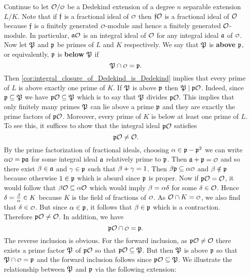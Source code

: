     Continue to let $\mc{O}/\smc{O}$ be a Dedekind extension of a degree $n$ separable extension $L/K$. Note that if $\mathfrak{f}$ is a fractional ideal of $\smc{O}$ then $\mathfrak{f}\mathcal{O}$ is a fractional ideal of $\mathcal{O}$ because $\mathfrak{f}$ is a finitely generated $\smc{O}$-module and hence a finitely generated $\mathcal{O}$-module. In particular, $\mathfrak{a}\mathcal{O}$ is an integral ideal of $\mathcal{O}$ for any integral ideal $\mathfrak{a}$ of $\smc{O}$. Now let $\mathfrak{P}$ and $\mathfrak{p}$ be primes of $L$ and $K$ respectively. We say that $\mathfrak{P}$ is \textbf{above} $\mathfrak{p}$, or equivalently, $\mathfrak{p}$ is \textbf{below} $\mathfrak{P}$ if
    \[
      \mf{P} \cap \smc{O} = \mf{p}.
    \]
    Then \cref{cor:integral_closure_of_Dedekind_is_Dedekind} implies that every prime of $L$ is above exactly one prime of $K$. If $\mathfrak{P}$ is above $\mathfrak{p}$ then $\mathfrak{P} \mid \mathfrak{p}\mathcal{O}$. Indeed, since $\mathfrak{p} \subseteq \mathfrak{P}$ we have $\mathfrak{p}\mathcal{O} \subseteq \mathfrak{P}$ which is to say that $\mathfrak{P}$ divides $\mathfrak{p}\mathcal{O}$. This implies that only finitely many primes $\mathfrak{P}$ can lie above a prime $\mathfrak{p}$ and they are exactly the prime factors of $\mathfrak{p}\mathcal{O}$. Moreover, every prime of $K$ is below at least one prime of $L$. To see this, it suffices to show that the integral ideal $\mathfrak{p}\mathcal{O}$ satisfies
    \[
      \mathfrak{p}\mathcal{O} \neq \mathcal{O}.
    \]
    By the prime factorization of fractional ideals, choosing $\alpha \in \mathfrak{p}-\mathfrak{p}^{2}$ we can write $\a\smc{O} = \mf{p}\mf{a}$ for some integral ideal $\mathfrak{a}$ relatively prime to $\mathfrak{p}$. Then $\mf{a}+\mf{p} = \smc{O}$ and so there exist $\beta \in \mathfrak{a}$ and $\gamma \in \mathfrak{p}$ such that $\beta+\gamma = 1$. Then $\b\mf{p} \subseteq \a\smc{O}$ and $\beta \notin \mathfrak{p}$ because otherwise $1 \in \mathfrak{p}$ which is absurd since $\mathfrak{p}$ is proper. Now if $\mathfrak{p}\mathcal{O} = \mathcal{O}$, it would follow that $\beta\mathcal{O} \subseteq \alpha\mathcal{O}$ which would imply $\beta = \alpha\delta$ for some $\delta \in \mathcal{O}$. Hence $\delta = \frac{\beta}{\alpha} \in K$ because $K$ is the field of fractions of $\smc{O}$. As $\mc{O} \cap K = \smc{O}$, we also find that $\d \in \smc{O}$. But since $\alpha \in \mathfrak{p}$, it follows that $\beta \in \mathfrak{p}$ which is a contraction. Therefore $\mathfrak{p}\mathcal{O} \neq \mathcal{O}$. In addition, we have
    \[
      \mf{p}\mc{O} \cap \smc{O} = \mf{p}.
    \]
    The reverse inclusion is obvious. For the forward inclusion, as $\mathfrak{p}\mathcal{O} \neq \mathcal{O}$ there exists a prime factor $\mathfrak{P}$ of $\mathfrak{p}\mathcal{O}$ so that $\mathfrak{p}\mathcal{O} \subseteq \mathfrak{P}$. But then $\mathfrak{P}$ is above $\mathfrak{p}$ so that $\mf{P} \cap \smc{O} = \mf{p}$ and the forward inclusion follows since $\mathfrak{p}\mathcal{O} \subseteq \mathfrak{P}$. We illustrate the relationship between $\mathfrak{P}$ and $\mathfrak{p}$ via the following extension:

